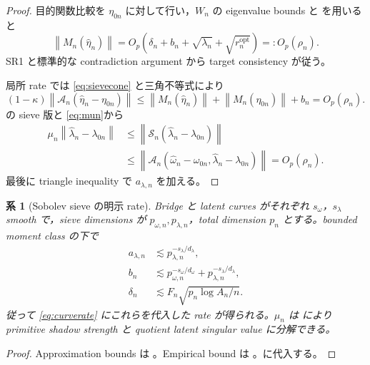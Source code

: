 \documentclass[11pt,a4paper]{ltjsarticle}
\newtheorem{corollary}{系}[section]
\theoremstyle{remark}
\newcommand{\wh}{\widehat}
\newcommand{\norm}[1]{\left\lVert#1\right\rVert}
\newcommand{\Aop}{\mathscr A}
\newcommand{\Sop}{\mathscr S}
\begin{document}
\begin{proof}
目的関数比較を $\eta_{0n}$ に対して行い，$W_n$ の eigenvalue bounds と を用いると
\begin{equation}
\norm{M_n(\wh\eta_n)}
=O_p\left(
\delta_n+b_n+\sqrt{\lambda_n}
+\sqrt{r_n^{\mathrm{opt}}}
\right)
=:O_p(\rho_n).
\label{eq:popmomentbound}
\end{equation}
SR1 と標準的な contradiction argument から target consistency が従う。

局所 rate では \eqref{eq:sievecone} と三角不等式により
\[
(1-\kappa)
\norm{\Aop_n(\wh\eta_n-\eta_{0n})}
\le
\norm{M_n(\wh\eta_n)}+\norm{M_n(\eta_{0n})}+b_n
=O_p(\rho_n).
\]
の sieve 版と \eqref{eq:mun}から
\begin{align*}
\mu_n\norm{\wh\lambda_n-\lambda_{0n}}
&\le\norm{\Sop_n(\wh\lambda_n-\lambda_{0n})}\\
&\le\norm{\Aop_n(\wh\omega_n-\omega_{0n},
\wh\lambda_n-\lambda_{0n})}
=O_p(\rho_n).
\end{align*}
最後に triangle inequality で $a_{\lambda,n}$ を加える。
\end{proof}

\begin{corollary}[Sobolev sieve の明示 rate]\label{cor:sobolevrate}
Bridge と latent curves がそれぞれ $s_\omega$，$s_\lambda$ smooth で，sieve dimensions が $p_{\omega,n},p_{\lambda,n}$，total dimension $p_n$ とする。bounded moment class の下で
\begin{align*}
a_{\lambda,n}&\lesssim p_{\lambda,n}^{-s_\lambda/d_\lambda},\\
b_n&\lesssim p_{\omega,n}^{-s_\omega/d_\omega}
+p_{\lambda,n}^{-s_\lambda/d_\lambda},\\
\delta_n&\lesssim
F_n\sqrt{p_n\log A_n/n}.
\end{align*}
従って \eqref{eq:curverate} にこれらを代入した rate が得られる。$\mu_n$ は により primitive shadow strength と quotient latent singular value に分解できる。
\end{corollary}

\begin{proof}
Approximation bounds は 。Empirical bound は 。に代入する。
\end{proof}
\end{document}
